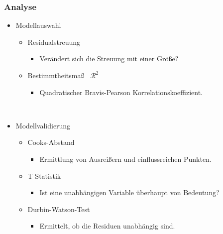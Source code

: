 \documentclass{beamer}
\begin{document}
\begin{frame}
 \frametitle{Analyse}

 \begin{itemize}

  \item Modellauswahl
  \begin{itemize}
   \item Residualstreuung 
   \begin{itemize}
    \item Verändert sich die Streuung mit einer Gr\"o\ss e?
   \end{itemize}
   \item Bestimmtheitsma\ss~ $\mathcal{R}^2$
   \begin{itemize}
    \item Quadratischer Bravis-Pearson Korrelationskoeffizient.
   \end{itemize}
  \end{itemize}
  ~\\
  \pause
  \item Modellvalidierung
  \begin{itemize}
   \item Cooks-Abstand
   \begin{itemize}
    \item Ermittlung von Ausrei\ss ern und einflussreichen Punkten.
   \end{itemize}
   \item T-Statistik
   \begin{itemize}
    \item Ist eine unabh\"angigen Variable \"uberhaupt von Bedeutung?
   \end{itemize}
   \item Durbin-Watson-Test
   \begin{itemize}
    \item Ermittelt, ob die Residuen unabhängig sind.
   \end{itemize}


  \end{itemize}

 \end{itemize}


%
%

\end{frame}
\end{document}
